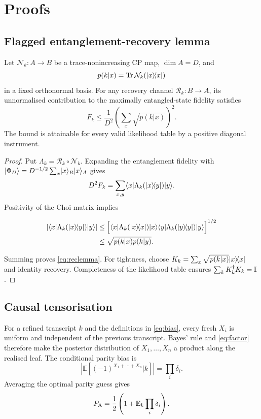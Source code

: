 \section{Proofs}
\label{app:proofs}

\subsection{Flagged entanglement-recovery lemma}

\begin{lemma}
Let $\mathcal N_k:A\rightarrow B$ be a trace-nonincreasing CP map, $\dim A=D$, and
\[
p(k|x)=\operatorname{Tr}\mathcal N_k(\lvert x\rangle\!\langle x\rvert)
\]
in a fixed orthonormal basis. For any recovery channel $\mathcal R_k:B\rightarrow A$, its unnormalised contribution to the maximally entangled-state fidelity satisfies
\begin{equation}
F_k\leq\frac1{D^2}\left(\sum_x\sqrt{p(k|x)}\right)^2.
\label{eq:reclemma}
\end{equation}
The bound is attainable for every valid likelihood table by a positive diagonal instrument.
\end{lemma}

\begin{proof}
Put $\Lambda_k=\mathcal R_k\circ\mathcal N_k$. Expanding the entanglement fidelity with $\lvert \Phi_D\rangle=D^{-1/2}\sum_x\lvert x\rangle_R\lvert x\rangle_A$ gives
\[
D^2F_k=\sum_{x,y}
\langle x\rvert\Lambda_k(\lvert x\rangle\!\langle y\rvert)\lvert y\rangle.
\]
Positivity of the Choi matrix implies
\begin{small}
\begin{align*}
\left|\langle x\rvert\Lambda_k(\lvert x\rangle\!\langle y\rvert)\lvert y\rangle\right|
&\leq\Big[
\langle x\rvert\Lambda_k(\lvert x\rangle\!\langle x\rvert)\lvert x\rangle
\langle y\rvert\Lambda_k(\lvert y\rangle\!\langle y\rvert)\lvert y\rangle\Big]^{1/2}\\
&\leq\sqrt{p(k|x)p(k|y)}.
\end{align*}
\end{small}
Summing proves \eqref{eq:reclemma}. For tightness, choose
$K_k=\sum_x\sqrt{p(k|x)}\lvert x\rangle\!\langle x\rvert$ and identity recovery. Completeness of the likelihood table ensures $\sum_kK_k^\dagger K_k=\mathbb{I}$.
\end{proof}

\subsection{Causal tensorisation}

For a refined transcript $k$ and the definitions in \eqref{eq:bias}, every fresh $X_i$ is uniform and independent of the previous transcript. Bayes' rule and \eqref{eq:factor} therefore make the posterior distribution of $X_1,\ldots,X_n$ a product along the realised leaf. The conditional parity bias is
\[
\left|\mathbb E[(-1)^{X_1+\cdots+X_n}|k]\right|
=\prod_i\delta_i.
\]
Averaging the optimal parity guess gives
\begin{equation}
P_{\mathrm A}=\frac12\left(1+\mathbb E_k\prod_i\delta_i\right).
\label{eq:PAprod}
\end{equation}


